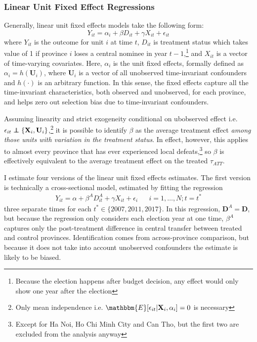 \documentclass[12pt]{article}\usepackage[]{graphicx}\usepackage[]{color}
\newcommand{\1}{\mathbbm{1}}
\newcommand\E{\mathbbm{E}}
\newcommand\indep{\protect\mathpalette{\protect\independenT}{\perp}}
\def\independenT#1#2{\mathrel{\rlap{$#1#2$}\mkern2mu{#1#2}}}
\begin{document}
\subsubsection{Linear Unit Fixed Effect Regressions}
\label{sec:FE}
Generally, linear unit fixed effects models take the following form:
\begin{equation}
	Y_{it} = \alpha_i + \beta D_{it} + \gamma X_{it} + \epsilon_{it} \tag{FE}\label{eq:FE}
\end{equation}
where $Y_{it}$ is the outcome for unit $i$ at time $t$, $D_{it}$ is treatment status which takes value of 1 if province $i$ loses a central nominee in year $t-1$,\footnote{Because the election happens after budget decision, any effect would only show one year after the election} and $X_{it}$ is a vector of time-varying covariates. Here, $\alpha_i$ is the unit fixed effects, formally defined as $\alpha_i= h(\mathbf{U}_i)$, where $\mathbf{U}_i$ is a vector of all unobserved time-invariant confounders and $h(\cdot)$ is an arbitrary function. In this sense, the fixed effects capture all the time-invariant characteristics, both observed and unobserved, for each province, and helps zero out selection bias due to time-invariant confounders.

Assuming linearity and strict exogeneity conditional on ubobserved effect i.e. $\epsilon_{it} \indep \{\mathbf{X}_i, \mathbf{U}_i\}$,\footnote{Only mean independence i.e. $\E[\epsilon_{it} | \mathbf{X}_i, \alpha_i] = 0$ is necessary} it is possible to identify $\beta$ as the average treatment effect \textit{among those units with variation in the treatment status}. In effect, however, this applies to almost every province that has ever experienced local defeats,\footnote{Except for Ha Noi, Ho Chi Minh City and Can Tho, but the first two are excluded from the analysis anyway} so $\beta$ is effectively equivalent to the average treatment effect on the treated $\tau_{ATT}$.

I estimate four versions of the linear unit fixed effects estimates. The first version is technically a cross-sectional model, estimated by fitting the regression
\begin{align*}
	Y_{it} = \alpha + \beta^{A} D^{A}_{it} + \gamma X_{it} + \epsilon_{i} & &i = 1,\dots, N; t = t^* \tag{FE.1}\label{eq:FE.1}
\end{align*}
three separate times for each $t^* \in \{2007, 2011, 2017\}$. In this regression, $\mathbf{D}^{A} = \mathbf{D}$, but because the regression only considers each election year at one time, $\beta^{A}$ captures only the post-treatment difference in central transfer between treated and control provinces. Identification comes from across-province comparison, but because it does not take into account unobserved confounders the estimate is likely to be biased. 
\end{document}
